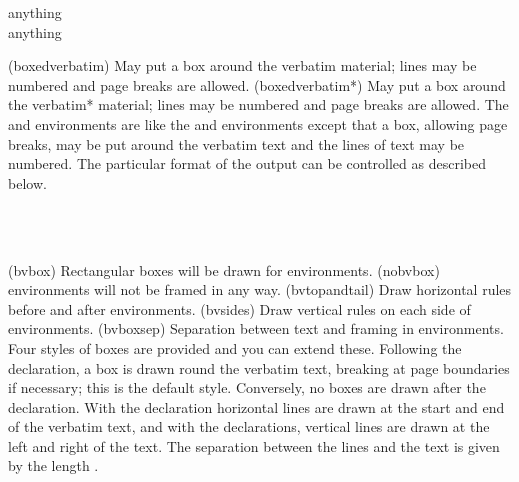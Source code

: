 {{{{\begin{syntax}
 anything  \\
 anything  \\
\end{syntax}
\glossary(boxedverbatim)%
  {}%
  {May put a box around the verbatim material; lines may be numbered and page
   breaks are allowed.}
\glossary(boxedverbatim*)%
  {}%
  {May put a box around the verbatim* material; lines may be numbered and page
   breaks are allowed.}
The  and  environments are like
the  and  environments except that a box,
allowing page breaks, may be put around the verbatim text and the lines
of text may be numbered.
The particular format of the output can be 
controlled as described below.
\begin{syntax}
\cmd{\bvbox} \cmd{\bvtopandtail} \cmd{\bvsides} \cmd{\nobvbox} \\
\lnc{\bvboxsep} \\
\end{syntax}
\glossary(bvbox)%
  {}%
  {Rectangular boxes will be drawn for  environments.}
\glossary(nobvbox)%
  {}%
  { environments will not be framed in any way.}
\glossary(bvtopandtail)%
  {}%
  {Draw horizontal rules before and after  environments.}
\glossary(bvsides)%
  {}%
  {Draw vertical rules on each side of  environments.}
\glossary(bvboxsep)%
  {}%
  {Separation between text and framing in  environments.}
Four styles of boxes are provided and you can extend these. Following
the \cmd{\bvbox} declaration, a box is drawn round the verbatim text, breaking
at page boundaries if necessary; this is the default style. Conversely,
no boxes are drawn after the \cmd{\nobvbox} declaration. With the
\cmd{\bvtopandtail} declaration horizontal lines are drawn at the start and 
end of the verbatim text, and with the \cmd{\bvsides} declarations, vertical
lines are drawn at the left and right of the text. The separation between
the lines and the text is given by the length \lnc{\bvboxsep}.

}}}}
